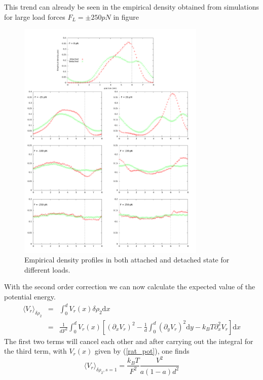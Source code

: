 \documentclass[aps,pre,onecolumn,showpacs,showkeys,a4paper]{revtex4}
\newcommand{\rmd}{{\mathrm d}}
\begin{document}
This trend can already be seen in the empirical density obtained from simulations for large load forces $F_L =\pm250 pN$ in figure\par
 \begin{figure}[h]
 \centering
 \includegraphics[width=0.8\textwidth,height=!]{pos_multiplot}
 \caption{Empirical density profiles in both attached and detached state for different loads.}
 \label{Fig: pos_multiplot}
 \end{figure}
With the second order correction we can now calculate the expected value of the potential energy.
\begin{eqnarray}
\langle V_r \rangle_{\delta\rho_2} &=& \int_0^d V_r(x)\delta\rho_2 \rmd x\nonumber\\
&=& \frac{1}{dF^2}\int_0^d V_r(x) \left[\left(\partial_xV_r\right)^2 - \frac{1}{d}\int_0^d\left(\partial_yV_r\right)^2 \rmd y  - k_B T \partial_x^2V_r\right]\rmd x
\end{eqnarray}
The first two terms will cancel each other and after carrying out the integral for the third term, with $V_r(x)$ given by (\ref{rat_pot}), one finds 
\begin{equation}
\langle V_r \rangle_{\delta\rho_2, s=1} = \frac{k_B T}{F^2}\frac{V^2}{a\left(1-a\right)d^2}
\end{equation}
\end{document}
